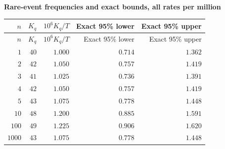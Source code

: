 
\begingroup\small
\setlength{\tabcolsep}{4pt}
\noindent\textbf{Rare-event frequencies and exact bounds, all rates per million}
\begin{longtable}{rrrrr}
\toprule
$n$ & $K_q$ & $10^6 K_q/T$ & Exact 95\% lower & Exact 95\% upper \\
\midrule
\endfirsthead
$n$ & $K_q$ & $10^6 K_q/T$ & Exact 95\% lower & Exact 95\% upper \\
\midrule
\endhead
\bottomrule
\endfoot
$1$ & $40$ & $1.000$ & $0.714$ & $1.362$ \\
$2$ & $42$ & $1.050$ & $0.757$ & $1.419$ \\
$3$ & $41$ & $1.025$ & $0.736$ & $1.391$ \\
$4$ & $42$ & $1.050$ & $0.757$ & $1.419$ \\
$5$ & $43$ & $1.075$ & $0.778$ & $1.448$ \\
$10$ & $48$ & $1.200$ & $0.885$ & $1.591$ \\
$100$ & $49$ & $1.225$ & $0.906$ & $1.620$ \\
$1000$ & $43$ & $1.075$ & $0.778$ & $1.448$ \\
\end{longtable}
\endgroup
